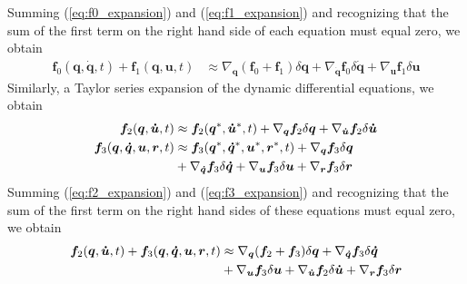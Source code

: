 \documentclass[smallcondensed,final]{svjour3}                     %
\begin{document}
Summing (\ref{eq:f0_expansion}) and (\ref{eq:f1_expansion}) and recognizing
that the sum of the first term on the right hand side of each equation must
equal zero, we obtain
\begin{align}
  \label{eq:f0_plus_f1_expansion}
  \bm{f}_{0}(\bm{q}, \bm{\dot{q}}, t) + \bm{f}_{1}(\bm{q}, \bm{u}, t) &\approx
  \nabla_{\bm{q}}(\bm{f}_{0} + \bm{f}_{1}) \delta\bm{q} +
  \nabla_{\bm{\dot{q}}}\bm{f}_{0} \delta\bm{\dot{q}} +
  \nabla_{\bm{u}}\bm{f}_{1} \delta\bm{u}
\end{align}
Similarly, a Taylor series expansion of the dynamic differential equations, we
obtain
\begin{align}
  \label{eq:f2_expansion}
  \bm{f}_{2}(\bm{q}, \bm{\dot{u}}, t) &\approx
      \bm{f}_{2}(\bm{q}^*, \bm{\dot{u}}^*, t) +
      \nabla_{\bm{q}}\bm{f}_{2} \delta\bm{q}
      + \nabla_{\bm{\dot{u}}}\bm{f}_{2} \delta\bm{\dot{u}}\\
  \bm{f}_{3}(\bm{q}, \bm{\dot{q}}, \bm{u}, \bm{r}, t) &\approx
  \bm{f}_{3}(\bm{q}^*, \bm{\dot{q}}^*, \bm{u}^*, \bm{r}^*, t) +
  \nabla_{\bm{q}}\bm{f}_{3} \delta\bm{q}\notag\\
  \label{eq:f3_expansion}
  &+ \nabla_{\bm{\dot{q}}}\bm{f}_{3} \delta\bm{\dot{q}}
  + \nabla_{\bm{u}}\bm{f}_{3} \delta \bm{u}
  + \nabla_{\bm{r}}\bm{f}_{3} \delta\bm{r}
\end{align}
Summing (\ref{eq:f2_expansion}) and (\ref{eq:f3_expansion}) and recognizing
that the sum of the first term on the right hand sides of these equations must
equal zero, we obtain
\begin{align}
  \bm{f}_{2}(\bm{q}, \bm{\dot{u}}, t) + \bm{f}_{3}(\bm{q}, \bm{\dot{q}},
  \bm{u}, \bm{r}, t) &\approx \nabla_{\bm{q}}(\bm{f}_2 + \bm{f}_3)
  \delta\bm{q} + \nabla_{\bm{\dot{q}}}\bm{f}_{3} \delta\bm{\dot{q}}\notag\\
  \label{eq:f2_plus_f3_expansion}
  &+ \nabla_{\bm{u}}\bm{f}_{3} \delta\bm{u} +
  \nabla_{\bm{\dot{u}}}\bm{f}_{2} \delta\bm{\dot{u}} + \nabla_{\bm{r}}\bm{f}_{3} \delta\bm{r}
\end{align}
\end{document}
